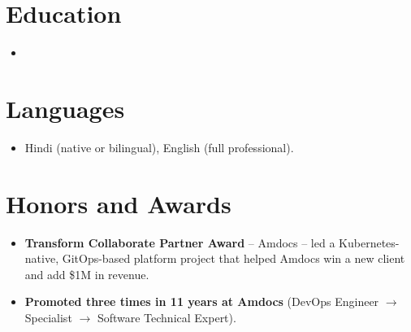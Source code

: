 \documentclass[11pt,a4paper,sans]{moderncv}
\begin{document}

\section{Education}
\vspace{1pt}
\begin{itemize}

\item{}

\end{itemize}


\section{Languages}
\vspace{1pt}
\begin{itemize}
\item {Hindi (native or bilingual), English (full professional).}
\end{itemize}


\section{Honors and Awards}
\vspace{1pt}
\begin{itemize}
\item{\textbf{Transform Collaborate Partner Award} -- Amdocs -- led a Kubernetes-native, GitOps-based platform project that helped Amdocs win a new client and add \$1M in revenue.}
\item{\textbf{Promoted three times in 11 years at Amdocs} (DevOps Engineer \(\to\) Specialist \(\to\) Software Technical Expert).}
\end{itemize}

\end{document}
